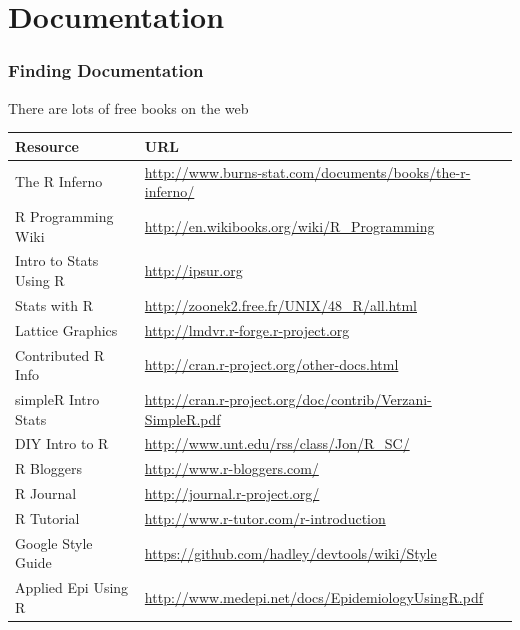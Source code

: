 \documentclass{beamer}
\begin{document}
\section{Documentation}

\begin{frame}[fragile]
\frametitle{Finding Documentation}
There are lots of free books on the web
\newline
\scriptsize

\begin{tabular}{| l | l |}
  \hline         
  \textbf{Resource} & \textbf{URL} \\ \hline
  The R Inferno & \url{http://www.burns-stat.com/documents/books/the-r-inferno/} \\ \hline
  R Programming Wiki & \url{http://en.wikibooks.org/wiki/R_Programming}  \\ \hline
  Intro to Stats Using R & \url{http://ipsur.org} \\ \hline
  Stats with R & \url{http://zoonek2.free.fr/UNIX/48_R/all.html} \\ \hline
  Lattice Graphics & \url{http://lmdvr.r-forge.r-project.org} \\ \hline
  Contributed R Info & \url{http://cran.r-project.org/other-docs.html} \\ \hline
  simpleR Intro Stats & \url{http://cran.r-project.org/doc/contrib/Verzani-SimpleR.pdf} \\ \hline
  DIY Intro to R & \url{http://www.unt.edu/rss/class/Jon/R_SC/} \\ \hline
  R Bloggers & \url{http://www.r-bloggers.com/} \\ \hline
  R Journal & \url{http://journal.r-project.org/} \\ \hline
  R Tutorial & \url{http://www.r-tutor.com/r-introduction} \\ \hline
  Google Style Guide & \url{https://github.com/hadley/devtools/wiki/Style} \\ \hline
  Applied Epi Using R & \url{http://www.medepi.net/docs/EpidemiologyUsingR.pdf} \\ \hline
  \hline  
\end{tabular}
\end{frame}


\end{document}

